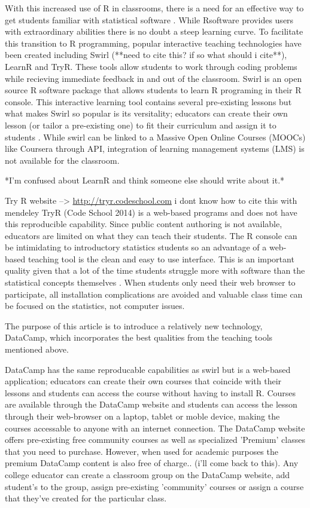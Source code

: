 \documentclass[12pt]{article}
\begin{document}
With this increased use of R in classrooms, there is a need for an effective way to get students familiar with statistical software
\cite{Baumer2014}. While Rsoftware provides users with extraordinary abilities there is no doubt a steep learning curve. To facilitate
this transition to R programming, popular interactive teaching technologies have been created including Swirl (**need to cite this?
if so what should i cite**), LearnR and TryR. 
These tools allow students to work through coding problems while recieving immediate feedback in and out of the classroom. Swirl is an
open source R software package that allows students to learn R programing in their R console. This interactive learning tool
contains several pre-existing lessons but what makes Swirl so popular is its versitality; educators can create their own
lesson (or tailor a pre-existing one) to fit their curriculum and assign it to students \cite{Carchedi2014}.
While swirl can be linked to a Massive Open Online Courses (MOOCs) like Coursera through API, integration of learning management 
systems (LMS) is not available for the classroom.

*I'm confused about LearnR and think someone else should write about it.*


Try R website --> \url{http://tryr.codeschool.com} i dont know how to cite this with mendeley
TryR (Code School 2014) is a web-based programs and does not have this reproducible capability. Since public content authoring
is not available, educators are limited on what they can teach their students. The R console can be intimidating to
introductory statistics students so an advantage of a web-based teaching tool is
the clean and easy to use interface. This is an important quality given that a lot of the time students struggle more with
software than the statistical concepts themselves \cite{Hare2017}. When students only need their web browser to participate,
all installation complications are avoided and valuable class time can be focused on the statistics, not computer issues.

The purpose of this article is to introduce a relatively new technology, DataCamp, which incorporates the best
qualities from the teaching tools mentioned above.

DataCamp has the same reproducable capabilities as swirl but is a web-based application; educators can
create their own courses that coincide with their lessons and students can access the course without having to install R.
Courses are available through the DataCamp website and students can access the lesson through their web-browser on a laptop,
tablet or moble device, making the courses accessable to anyone with an internet connection. 
The DataCamp website offers pre-existing free community courses as well as specialized 'Premium' classes that you need to purchase. 
However, when used for academic purposes the premium DataCamp content is also free of charge.. (i'll come back to this).
Any college educator can create a classroom group on the DataCamp website, add student's to the group, assign pre-existing 
'community' courses or assign a course that they've created for the particular class. 
\end{document}

